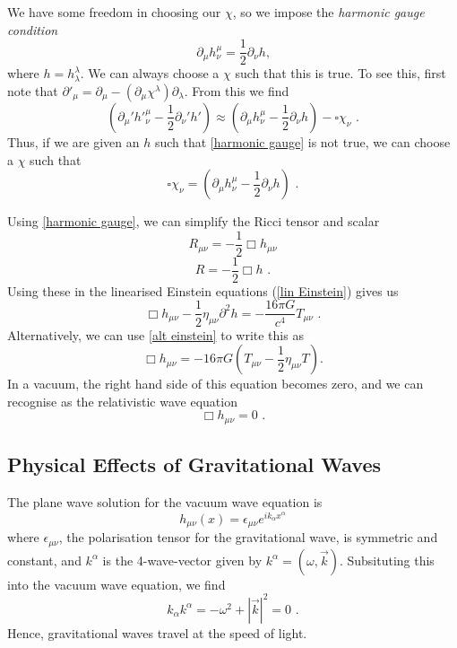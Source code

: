 \documentclass[11pt]{cuthesis}
\newcommand{\mn}{_{\mu\nu}}
\newcommand{\fs}{\text{ .}}
\begin{document}
We have some freedom in choosing our $\chi$, so we impose the \textit{harmonic gauge condition}
\begin{equation} \label{harmonic gauge}
\partial_\mu h^\mu_\nu = \frac{1}{2} \partial_\nu h \text{,}
\end{equation}
where $h=h^\lambda_\lambda$. We can always choose a $\chi$ such that this is true. To see this, first note that $\partial'_\mu = \partial_\mu - (\partial_\mu \chi^\lambda) \partial_\lambda$. From this we find
\begin{equation}
(\partial_\mu' {h'}_\nu^\mu - \frac{1}{2}\partial_\nu' h') \approx (\partial_\mu h^\mu_\nu - \frac{1}{2} \partial_\nu h ) -\square \chi_\nu \fs
\end{equation}
Thus, if we are given an $h$ such that \ref{harmonic gauge} is not true, we can choose a $\chi$ such that 
\begin{equation} \label{harmonic chi}
\square \chi_\nu = (\partial_\mu h^\mu_\nu - \frac{1}{2}\partial_\nu h) \fs
\end{equation}

Using \ref{harmonic gauge}, we can simplify the Ricci tensor and scalar
\begin{equation}
R\mn = -\frac{1}{2}\Box h\mn
\end{equation}
\begin{equation}
R=-\frac{1}{2}\Box h \fs
\end{equation}
Using these in the linearised Einstein equations (\ref{lin Einstein}) gives us
\begin{equation} \label{lin einstein eqn}
\Box h\mn - \frac{1}{2}\eta\mn\partial^2 h =-\frac{16\pi G}{c^4}T\mn \fs
\end{equation}
Alternatively, we can use \ref{alt einstein} to write this as
\begin{equation}
\Box h\mn = -16\pi G \left( T\mn -\frac{1}{2} \eta\mn T \right). 
\end{equation}
In a vacuum, the right hand side of this equation becomes zero, and we can recognise as the relativistic wave equation
 \begin{equation}
\Box h\mn = 0 \fs
\end{equation}

\subsection{Physical Effects of Gravitational Waves} \label{sec:GW effects}
The plane wave solution for the vacuum wave equation is
\begin{equation} \label{plane wave}
h\mn (x) = \epsilon\mn e^{ik_\alpha x^\alpha} 
\end{equation}
where $\epsilon\mn$, the polarisation tensor for the gravitational wave, is symmetric and constant, and $k^\alpha$ is the 4-wave-vector given by $k^\alpha = (\omega,\vec{k})$. Subsituting this into the vacuum wave equation, we find 
\begin{equation}
k_\alpha k^\alpha = -\omega^2 + |\vec{k}|^2 =0 \fs
\end{equation}
Hence, gravitational waves travel at the speed of light. 
\end{document}
